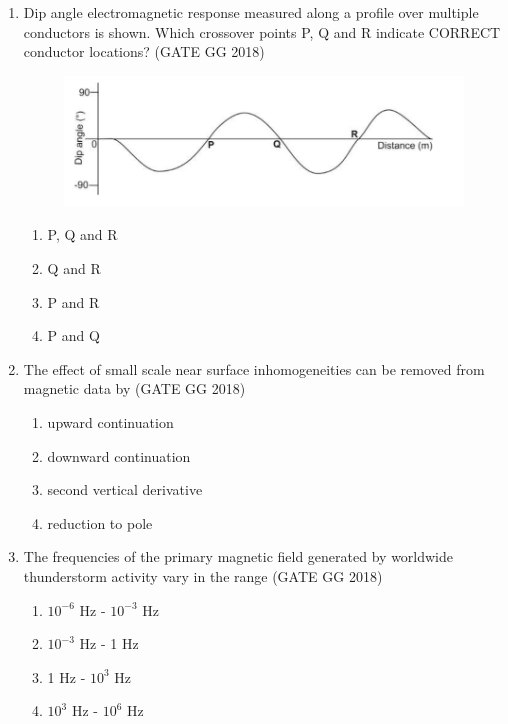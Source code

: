 \documentclass[journal]{IEEEtran}
\begin{document}
\begin{enumerate}[start=1]
\item Dip angle electromagnetic response measured along a profile over multiple conductors is shown.  
Which crossover points P, Q and R indicate CORRECT conductor locations?
\hfill(GATE GG 2018)
\begin{figure}[H]
        \centering
        \includegraphics[width=0.5\columnwidth]{figs/10.png}
        \caption*{}
        \label{fig:q10}
    \end{figure}
\begin{multicols}{2}
\begin{enumerate}
\item P, Q and R
\item Q and R
\item P and R
\item P and Q
\end{enumerate}
\end{multicols}

\item The effect of small scale near surface inhomogeneities can be removed from magnetic data by
\hfill(GATE GG 2018)
\begin{enumerate}
\item upward continuation
\item downward continuation
\item second vertical derivative
\item reduction to pole
\end{enumerate}

\item The frequencies of the primary magnetic field generated by worldwide thunderstorm activity vary in the range
\hspace*{15.7cm}(GATE GG 2018)
\begin{multicols}{2}
\begin{enumerate}
\item $10^{-6}$ Hz - $10^{-3}$ Hz
\item $10^{-3}$ Hz - 1 Hz
\item 1 Hz - $10^3$ Hz
\item $10^3$ Hz - $10^6$ Hz
\end{enumerate}
\end{multicols}


\end{enumerate}
\end{document}
